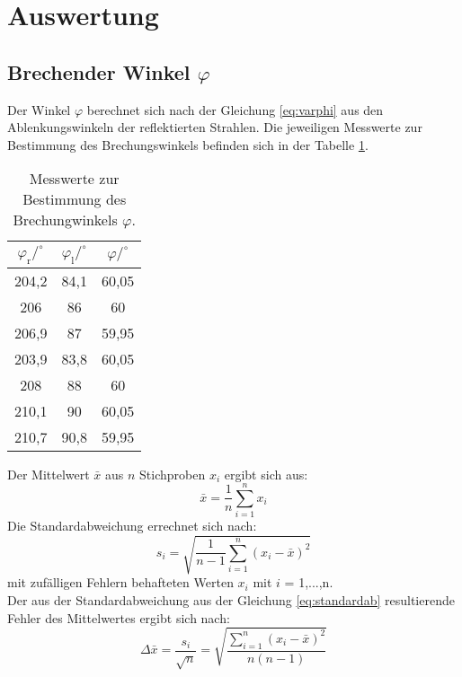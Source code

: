 \section{Auswertung}
\label{sec:Auswertung}

\subsection{Brechender Winkel \texorpdfstring{$\varphi$}{e}}

Der Winkel $\varphi$ berechnet sich nach der Gleichung \ref{eq:varphi} aus den Ablenkungswinkeln der reflektierten Strahlen. Die jeweiligen Messwerte zur Bestimmung des Brechungswinkels befinden sich in der Tabelle \ref{tab:brechungswinkel}.

\begin{table}[htpb]
	\centering
	\caption{Messwerte zur Bestimmung des Brechungwinkels $\varphi$.}
	\label{tab:brechungswinkel}
	\begin{tabular}{c c c}
		\toprule
		$\varphi_\text{r} / ^\circ$ & $\varphi_\text{l} / ^\circ$ & $\varphi / ^\circ$ \\
		\midrule
		204,2 & 84,1 & 60,05 \\
		206 & 86 & 60 \\
		206,9 & 87 & 59,95 \\
		203,9 & 83,8 & 60,05 \\ 
		208 & 88 & 60 \\
		210,1 & 90 & 60,05 \\
		210,7 & 90,8 & 59,95 \\
		\bottomrule
	\end{tabular}
\end{table}

Der Mittelwert $\bar{x}$ aus $n$ Stichproben $x_{i}$ ergibt sich aus:
\begin{equation}
\bar{x}=\frac{1}{n}\sum \limits_{i=1}^n x_{i}
\label{eq:mittelwert}
\end{equation}
Die Standardabweichung errechnet sich nach:
\begin{equation}
\label{eq:standardab}
s_{i}= \sqrt{\frac{1}{n-1}\sum \limits_{i=1}^n(x_{i}-\bar{x})^2}
\end{equation}
mit zufälligen Fehlern behafteten Werten $x_{i}$ mit $i$ = 1,...,n.\\
Der aus der Standardabweichung aus der Gleichung \ref{eq:standardab} resultierende Fehler des Mittelwertes ergibt sich nach:
\begin{equation}
\Delta\bar{x}=\frac{s_{i}}{\sqrt{n}} = \sqrt{\frac{\sum\limits_{i=1}^n(x_{i}-\bar{x})^2}{n(n-1)}}
\label{eq:fehlermittelwert}
\end{equation}


